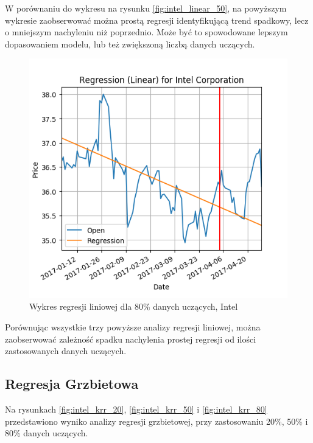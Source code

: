 W porównaniu do wykresu na rysunku \ref{fig:intel_linear_50}, na powyższym wykresie zaobserwować można prostą regresji identyfikującą trend spadkowy, lecz o mniejszym nachyleniu niż poprzednio.
Może być to spowodowane lepszym dopasowaniem modelu, lub też zwiększoną liczbą danych uczących.\\

\begin{figure}[ht]
\centering
\includegraphics[scale=0.4]{pictures/plots/intel_linear_80.png}
\caption{Wykres regresji liniowej dla 80\% danych uczących, Intel}
\label{fig:intel_linear_80}
\end{figure}

Porównując wszystkie trzy powyższe analizy regresji liniowej, można zaobserwować zależność spadku nachylenia prostej regresji od ilości zastosowanych danych uczących.

\subsection{Regresja Grzbietowa}

Na rysunkach \ref{fig:intel_krr_20}, \ref{fig:intel_krr_50} i \ref{fig:intel_krr_80} przedstawiono wyniko analizy regresji grzbietowej, przy zastosowaniu 20\%, 50\% i 80\% danych uczących.\\

